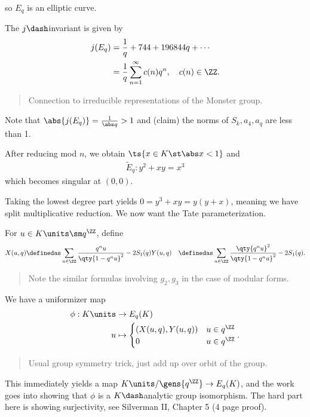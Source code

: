 so \(E_q\) is an elliptic curve.

The \(j\dash\)invariant is given by \begin{align*}
j(E_q) &= {1 \over q} + 744 +  196844q + \cdots \\
& = \frac 1 q \sum_{n=1}^\infty c(n) q^n,\quad c(n) \in \ZZ
.\end{align*}

\begin{quote}
Connection to irreducible representations of the Monster group.
\end{quote}

Note that \(\abs{j(E_q)} = {1 \over \abs q} > 1\) and (claim) the norms
of \(S_k, a_4, a_q\) are less than 1.

After reducing mod \(n\), we obtain \(\ts{x\in K \st \abs x < 1}\) and
\begin{align*}
\tilde E_q:  y^2 + xy = x^3
\end{align*} which becomes singular at \((0, 0)\).

Taking the lowest degree part yields \(0 = y^3 + xy = y(y+x)\), meaning
we have split multiplicative reduction. We now want the Tate
parameterization.

For \(u \in K\units \sm q^\ZZ\), define \begin{align*}
X(u, q) &\definedas \sum_{n\in \ZZ} {q^n u \over \qty{1 - q^n u}^2} - 2S_1(q)
Y(u, q) &\definedas \sum_{n\in \ZZ} {\qty{q^n u}^2 \over \qty{1 - q^n u}^2} - 2S_1(q)
.\end{align*}

\begin{quote}
Note the similar formulas involving \(g_2, g_3\) in the case of modular
forms.
\end{quote}

We have a uniformizer map \begin{align*}
\phi: K\units &\to E_q(K) \\
u &\mapsto
\begin{cases}
(X(u, q), Y(u, q)) & u\in q^\ZZ \\
0 & u\in q^\ZZ
\end{cases}
.\end{align*}

\begin{quote}
Usual group symmetry trick, just add up over orbit of the group.
\end{quote}

This immediately yields a map \(K\units / \gens{q^\ZZ} \to E_q(K)\), and
the work goes into showing that \(\phi\) is a \(K\dash\)analytic group
isomorphism. The hard part here is showing surjectivity, see Silverman
II, Chapter 5 (4 page proof).

